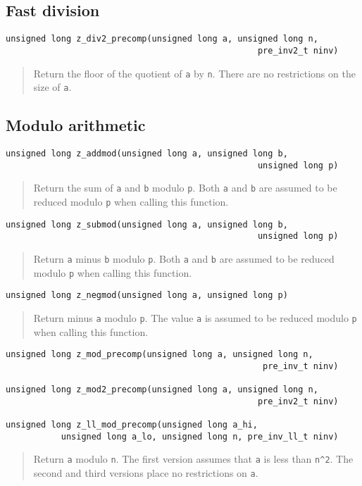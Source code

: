 \documentclass[a4paper,10pt]{article}
\newcommand{\code}{\lstinline}
\begin{document}
\subsection{Fast division}

\begin{lstlisting}
unsigned long z_div2_precomp(unsigned long a, unsigned long n, 
                                                  pre_inv2_t ninv)
\end{lstlisting}
\begin{quote}
Return the floor of the quotient of \code{a} by \code{n}. There are no restrictions on the size of \code{a}.
\end{quote}

\subsection{Modulo arithmetic}

\begin{lstlisting}
unsigned long z_addmod(unsigned long a, unsigned long b, 
                                                  unsigned long p)
\end{lstlisting}
\begin{quote}
Return the sum of \code{a} and \code{b} modulo \code{p}. Both \code{a} and \code{b} are assumed to be reduced modulo \code{p} when calling this function. 
\end{quote}

\begin{lstlisting}
unsigned long z_submod(unsigned long a, unsigned long b, 
                                                  unsigned long p)
\end{lstlisting}
\begin{quote}
Return \code{a} minus \code{b} modulo \code{p}. Both \code{a} and \code{b} are assumed to be reduced modulo \code{p} when calling this function. 
\end{quote}

\begin{lstlisting}
unsigned long z_negmod(unsigned long a, unsigned long p)
\end{lstlisting}
\begin{quote}
Return minus \code{a} modulo \code{p}. The value \code{a} is assumed to be reduced modulo \code{p} when calling this function. 
\end{quote}

\begin{lstlisting}
unsigned long z_mod_precomp(unsigned long a, unsigned long n, 
                                                   pre_inv_t ninv)

unsigned long z_mod2_precomp(unsigned long a, unsigned long n, 
                                                  pre_inv2_t ninv)

unsigned long z_ll_mod_precomp(unsigned long a_hi,
           unsigned long a_lo, unsigned long n, pre_inv_ll_t ninv)
\end{lstlisting}
\begin{quote}
Return \code{a} modulo \code{n}. The first version assumes that \code{a} is less than \code{n^2}. The second and third versions place no restrictions on \code{a}.
\end{quote}
\end{document}
